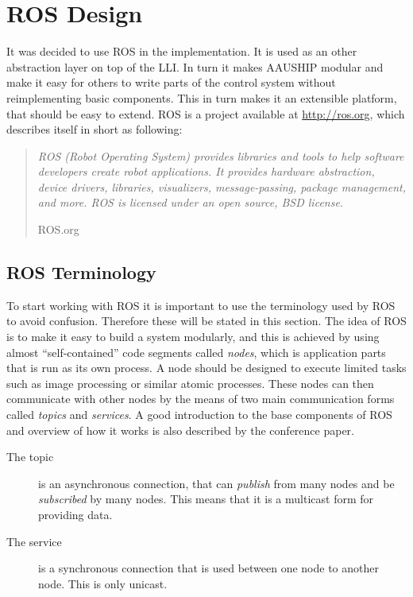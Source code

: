\chapter{\acs{ROS} Design}

\noindent It was decided to use \ac{ROS} in the implementation. It is used as an
other abstraction layer on top of the \ac{LLI}. In turn it makes AAUSHIP
modular and make it easy for others to write parts of the control
system without reimplementing basic components. This in turn makes it
an extensible platform, that should be easy to extend. \ac{ROS} is a
project available at \url{http://ros.org}, which describes itself in
short as following:

\begin{quote}
\textit{\noindent
	ROS (Robot Operating System) provides libraries and
	tools to help software developers create robot applications. It
	provides hardware abstraction, device drivers, libraries,
	visualizers, message-passing, package management, and more. ROS is
	licensed under an open source, BSD license.
}
		
	\hfill ROS.org
\end{quote}

\section{\acs{ROS} Terminology}
To start working with \ac{ROS} it is important to use the terminology
used by \ac{ROS} to avoid confusion. Therefore these  will be stated
in this section.  The idea of \ac{ROS} is to make it easy to build a
system modularly, and this is achieved by using almost
``self-contained'' code segments called \textit{nodes}, which is
application parts that is run as its own process. A node should be
designed to execute limited tasks such as image processing or similar
atomic processes. These nodes can then communicate with other nodes by
the means of two main communication forms called \textit{topics} and
\textit{services}. A good introduction to the base components of \ac{ROS}
and overview of how it works is also described by the
\citep{rosoverview} conference paper.

\begin{description}
\item[The topic] is an asynchronous connection, that can \textit{publish}
from many nodes and be \textit{subscribed} by many nodes. This means
that it is a multicast form for providing data.
\item[The service] is a synchronous connection that is used between one node
to another node. This is only unicast.
\end{description}

